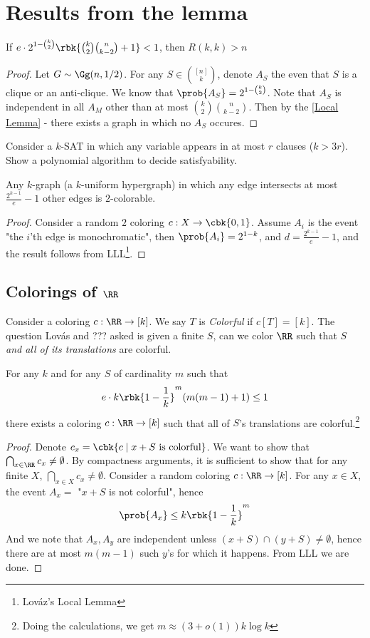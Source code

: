 \documentclass[a4paper, 11pt, oneside]{book}
\begin{document}
\section{Results from the lemma}
\begin{thm}
	 If $e\cdot 2^{1-{k\choose 2}}\rbk{{k\choose 2}{n\choose k-2} + 1}<1$, then $R(k,k) > n$
\end{thm}
\begin{proof}
	Let $G\sim \Gg(n,1/2)$. For any $S\in {[n]\choose k}$, denote $A_S$ the even that $S$ is a clique or an anti-clique. We know that $\prob{A_S} = 2^{1-{k\choose 2}}$. Note that $A_S$ is independent in all  $A_M$ other than at most $ {k\choose 2}{n\choose k-2}$. Then by the \autoref{Local Lemma} - there exists a graph in which no $A_S$ occures. 
\end{proof}
\begin{exercise}
\label{Ex local lemma}
Consider a $k$-SAT in which any variable appears in at most $r$ clauses ($k>3r$). Show a polynomial algorithm to decide satisfyability.
\end{exercise}
\begin{thm}
	Any $k$-graph (a $k$-uniform hypergraph) in which any edge intersects at most $\frac{2^{k-1}}{e} - 1$ other edges is $2$-colorable.
\end{thm}
\begin{proof}
	Consider a random $2$ coloring $c: X\to \cbk{0,1}$. Assume $A_i$ is the event "the $i$'th edge is monochromatic", then $\prob{A_i} = 2^{1-k}$, and $d = \frac{2^{k-1}}{e}-1$, and the result follows from LLL\footnote{Lov\'az's Local Lemma}.
\end{proof}
\subsection{Colorings of $\RR$}
Consider a coloring $c:\RR\to [k]$. We say $T$ is \emph{Colorful} if $c[T] = [k]$. The question Lov\'{a}s and ??? asked is given a finite $S$, can we color $\RR$ such that $S$ \emph{and all of its translations} are colorful.
\begin{thm}
	For any $k$ and for any $S$ of cardinality $m$ such that $$e\cdot k\rbk{1-\frac{1}{k}}^m(m(m-1)+1)\le 1$$  there exists a coloring $c:\RR\to [k]$ such that all of $S$'s translations are colorful.\footnote{Doing the calculations, we get $m \approx(3+o(1))k\log k$}
\end{thm}
\begin{proof}
	Denote $c_x = \cbk{c\mid x + S \text{ is colorful}}$. We want to show that $\bigcap_{x\in \RR} c_x \neq \emptyset$. By compactness arguments, it is sufficient to show that for any finite $X$, $\bigcap_{x\in X}c_x \neq \emptyset$. Consider a random coloring $c:\RR\to [k]$. For any $x\in X$, the event $A_x = $ "$x+S$ is not colorful", hence 
	\[
	\prob{A_x}\le k\rbk{1-\frac{1}{k}}^m
	\]
	And we note that $A_x,A_y$ are independent unless $(x+S)\cap (y+S) \neq \emptyset$, hence there are at most $m(m-1)$ such $y$'s for which it happens. From LLL we are done.
\end{proof}
\end{document}

